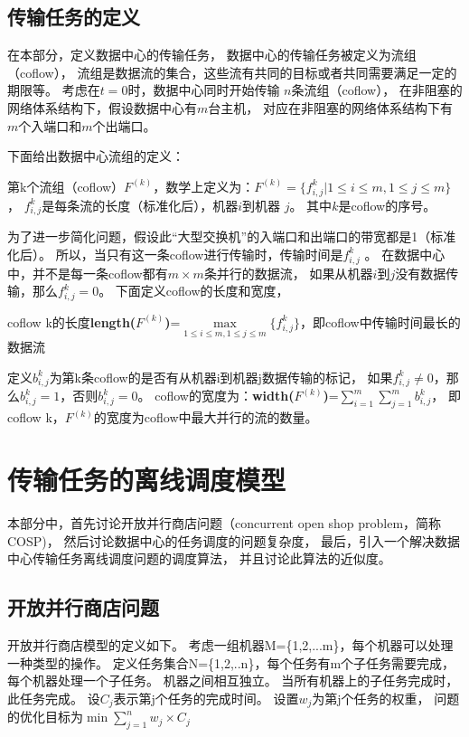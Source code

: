 \subsection{传输任务的定义}
在本部分，定义数据中心的传输任务，
数据中心的传输任务被定义为流组（coflow）\cite{chowdhury2014efficient}，
流组是数据流的集合，这些流有共同的目标或者共同需要满足一定的期限等\cite{chowdhury2012coflow,chowdhury2014efficient}。
考虑在$t=0$时，数据中心同时开始传输 $n$条流组（coflow），
在非阻塞的网络体系结构下，假设数据中心有$m$台主机，
对应在非阻塞的网络体系结构下有$m$个入端口和$m$个出端口。

下面给出数据中心流组的定义：
 \begin{definition}\label{defination-coflow}
第k个流组（coflow）$F^{(k)}$，数学上定义为：$F^{(k)}=\{f^k_{i,j}|1 \leq i\leq m,1\leq j \leq m\}$，
$f^k_{i,j}$是每条流的长度（标准化后），机器$i$到机器 $j$。
其中$k$是coflow的序号。
\end{definition}


为了进一步简化问题，假设此“大型交换机”的入端口和出端口的带宽都是1（标准化后）。
所以，当只有这一条coflow进行传输时，传输时间是$f^k_{i,j}$ 。
在数据中心中，并不是每一条coflow都有$m\times m$条并行的数据流，
如果从机器$i$到$j$没有数据传输，那么$f^k_{i,j}=0$。
下面定义coflow的长度和宽度，

 \begin{definition}\label{defination-length}
coflow k的长度\textbf{length($F^{(k)}$)}=$\max \limits_{1 \leq i\leq m,1\leq j \leq m}\{ f^k_{i,j}\}$，即coflow中传输时间最长的数据流
\end{definition}



 \begin{definition}\label{defination-width}
定义$b^k_{i,j}$为第k条coflow的是否有从机器i到机器j数据传输的标记，
如果$f^k_{i,j}\ne 0$，那么$b^k_{i,j}=1$，否则$b^k_{i,j}=0$。
coflow的宽度为：\textbf{width($F^{(k)}$)}=$\sum_{i=1}^m\sum_{j=1}^mb^k_{i,j}$，
即coflow k，$F^{(k)}$的宽度为coflow中最大并行的流的数量。
\end{definition}


\section{传输任务的离线调度模型}
本部分中，首先讨论开放并行商店问题（concurrent open shop problem，简称COSP)，
然后讨论数据中心的任务调度的问题复杂度，
最后，引入一个解决数据中心传输任务离线调度问题的调度算法，
并且讨论此算法的近似度。

\subsection{开放并行商店问题}\label{concurrent-open-shop}
开放并行商店模型的定义如下。
考虑一组机器M=\{1,2,...m\}，每个机器可以处理一种类型的操作。
定义任务集合N=\{1,2,..n\}，每个任务有m个子任务需要完成，
每个机器处理一个子任务。
机器之间相互独立。
当所有机器上的子任务完成时，此任务完成。
设$C_j$表示第j个任务的完成时间。
设置$w_j$为第j个任务的权重，
问题的优化目标为$\mathop {\min }\sum_{j=1}^n w_j\times C_j$

